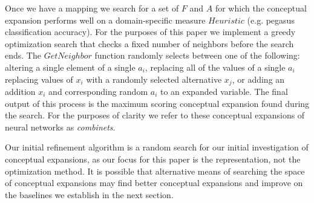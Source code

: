 \documentclass[letterpaper]{article}
\begin{document}
Once we have a mapping we search for a set of $F$ and $A$ for which the conceptual expansion performs well on a domain-specific measure $Heuristic$ (e.g. pegasus classification accuracy). For the purposes of this paper we implement a greedy optimization search that checks a fixed number of neighbors before the search ends. The $GetNeighbor$ function randomly selects between one of the following: altering a single element of a single $a_i$, replacing all of the values of a single $a_i$ replacing values of $x_i$ with a randomly selected alternative $x_j$, or adding an addition $x_i$ and corresponding random $a_i$ to an expanded variable. 
The final output of this process is the maximum scoring conceptual expansion found during the search.
For the purposes of clarity we refer to these conceptual expansions of neural networks as {\em combinets}.

Our initial refinement algorithm is a random search for our initial investigation of conceptual expansions, as our focus for this paper is the representation, not the optimization method.
It is possible that alternative means of searching the space of conceptual expansions may find better conceptual expansions and improve on the baselines we establish in the next section.
\end{document}
